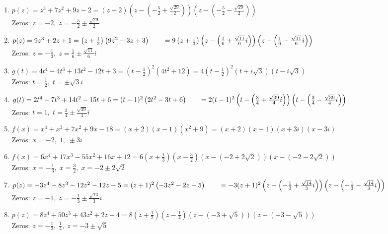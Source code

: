 \begin{enumerate}
\item  $p(z) = z^3 + 7z^2+9z-2 = (z+2) \left(z - \left( -\frac{5}{2}+\frac{\sqrt{29}}{2}\right) \right) \left(z - \left( -\frac{5}{2}-\frac{\sqrt{29}}{2}\right) \right)$ \\
Zeros:  $z = -2, \; z = -\frac{5}{2} \pm \frac{\sqrt{29}}{2}$
\item  $p(z) = 9z^3+2z+1 = \left(z + \frac{1}{3}\right) \left(9z^2 - 3z + 3\right) \\
\phantom{f(z)}= 9\left(z + \frac{1}{3}\right) \left(z - \left(\frac{1}{6} + \frac{\sqrt{11}}{6} i \right) \right) \left(z - \left(\frac{1}{6} - \frac{\sqrt{11}}{6} i \right) \right)$\\
Zeros:  $z = -\frac{1}{3}, \; z = \frac{1}{6} \pm \frac{\sqrt{11}}{6} i$

\item $g(t) = 4t^{4} - 4t^{3} + 13t^{2} - 12t + 3 = \left(t - \frac{1}{2}\right)^{2}\left(4t^{2} + 12\right) = 4\left(t - \frac{1}{2}\right)^{2}(t + i\sqrt{3})(t - i\sqrt{3})$\\
Zeros: $t = \frac{1}{2}, \; t = \pm \sqrt{3}i$
\item $g(t) = 2t^4-7t^3+14t^2-15t+6 = (t-1)^2 \left(2t^2 - 3t + 6\right)  \\
\phantom{f(t)} = 2 (t-1)^2 \left( t - \left( \frac{3}{4} +  \frac{\sqrt{39}}{4} i \right) \right)  \left( t - \left( \frac{3}{4} -  \frac{\sqrt{39}}{4} i \right) \right) $ \\
Zeros: $t = 1, \; t = \frac{3}{4}  \pm  \frac{\sqrt{39}}{4} i$



\item  $f(x) = x^4+x^3+7x^2+9x-18 = (x+2)(x-1)\left(x^2+9\right) = (x+2)(x-1)(x+3i)(x-3i)$\\
Zeros:  $x = -2, \; 1, \; \pm 3i$
\item  $f(x) = 6x^4+17x^3-55x^2+16x+12 = 6 \left(x + \frac{1}{3} \right) \left(x - \frac{3}{2} \right) \left(x - \left( -2 + 2 \sqrt{2}\right)\right) \left(x - \left( -2 - 2 \sqrt{2}\right)\right)$ \\
Zeros:  $x = -\frac{1}{3}, \; x = \frac{3}{2}, \; x = -2 \pm 2 \sqrt{2}$


\item  $p(z) = -3z^4-8z^3-12z^2-12z-5 = (z+1)^2 \left(-3z^2-2z-5\right) \\
\phantom{f(z)}= -3(z+1)^2\left(z - \left( -\frac{1}{3}+\frac{\sqrt{14}}{3} i\right) \right) \left(z - \left( -\frac{1}{3}-\frac{\sqrt{14}}{3} i\right) \right)$ \\
Zeros:  $z = -1, \; z = -\frac{1}{3} \pm \frac{\sqrt{14}}{3} i$
\item  $p(z) = 8z^4+50z^3+43z^2+2z-4 = 8\left(z + \frac{1}{2}\right) \left(z - \frac{1}{4}\right)(z - (-3 + \sqrt{5}))(z - (-3 - \sqrt{5}))$ \\
Zeros:  $z = -\frac{1}{2}, \; \frac{1}{4}, \; z = -3 \pm \sqrt{5}$


\end{enumerate}
